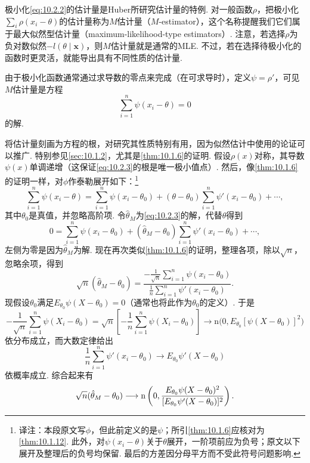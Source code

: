极小化\eqref{eq:10.2.2}的估计量是Huber所研究估计量的特例. 对一般函数$\rho$，把极小化$\sum_i\rho(x_i-\theta)$的估计量称为$M$估计量（$M$-estimator），这个名称提醒我们它们属于最大似然型估计量（maximum-likelihood-type estimators）. 注意，若选择$\rho$为负对数似然$-l(\theta\mid\boldsymbol x)$，则$M$估计量就是通常的MLE.
不过，若在选择待极小化的函数时更灵活，就能导出具有不同性质的估计量.

由于极小化函数通常通过求导数的零点来完成（在可求导时），定义$\psi=\rho'$，可见$M$估计量是方程
\begin{equation}\label{eq:10.2.3}
\sum_{i=1}^n\psi(x_i-\theta)=0
\end{equation}
的解.

将估计量刻画为方程的根，对研究其性质特别有用，因为似然估计中使用的论证可以推广. 特别参见\autoref{sec:10.1.2}，尤其是\autoref{thm:10.1.6}的证明. 假设$\rho(x)$对称，其导数$\psi(x)$单调递增（这保证\eqref{eq:10.2.3}的根是唯一极小值点）. 然后，像\autoref{thm:10.1.6}的证明一样，对$\phi$作泰勒展开如下：\footnote{译注：本段原文写$\phi$，但此前定义的是$\psi$；所引\autoref{thm:10.1.6}应核对为\autoref{thm:10.1.12}. 此外，对$\psi(x_i-\theta)$关于$\theta$展开，一阶项前应为负号；原文以下展开及整理后的负号均保留. 最后的方差因分母平方而不受此符号问题影响.}
$$\sum_{i=1}^n\psi(x_i-\theta)=\sum_{i=1}^n\psi(x_i-\theta_0)+(\theta-\theta_0)\sum_{i=1}^n\psi'(x_i-\theta_0)+\cdots,$$
其中$\theta_0$是真值，并忽略高阶项. 令$\hat\theta_M$为\eqref{eq:10.2.3}的解，代替$\theta$得到
$$0=\sum_{i=1}^n\psi(x_i-\theta_0)+(\hat\theta_M-\theta_0)\sum_{i=1}^n\psi'(x_i-\theta_0)+\cdots,$$
左侧为零是因为$\hat\theta_M$为解. 现在再次类似\autoref{thm:10.1.6}的证明，整理各项，除以$\sqrt n$，忽略余项，得到
$$\sqrt n(\hat\theta_M-\theta_0)=\frac{-\frac1{\sqrt n}\sum_{i=1}^n\psi(x_i-\theta_0)}{\frac1n\sum_{i=1}^n\psi'(x_i-\theta_0)}.$$
现假设$\theta_0$满足$E_{\theta_0}\psi(X-\theta_0)=0$（通常也将此作为$\theta_0$的定义）. 于是
\begin{equation}\label{eq:10.2.4}
-\frac1{\sqrt n}\sum_{i=1}^n\psi(X_i-\theta_0)
=\sqrt n\left[-\frac1n\sum_{i=1}^n\psi(X_i-\theta_0)\right]
\longrightarrow\mathrm n\bigl(0,E_{\theta_0}[\psi(X-\theta_0)]^2\bigr)
\end{equation}
依分布成立，而大数定律给出
\begin{equation}\label{eq:10.2.5}
\frac1n\sum_{i=1}^n\psi'(x_i-\theta_0)\longrightarrow E_{\theta_0}\psi'(X-\theta_0)
\end{equation}
依概率成立. 综合起来有
\begin{equation}\label{eq:10.2.6}\index{SI0815@极限分布}
\sqrt n(\hat\theta_M-\theta_0)\longrightarrow\mathrm n\left(0,\frac{E_{\theta_0}\psi(X-\theta_0)^2}{[E_{\theta_0}\psi'(X-\theta_0)]^2}\right).
\end{equation}

